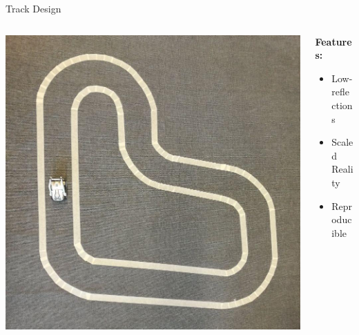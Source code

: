 \documentclass[aspectratio=169]{beamer}
\begin{document}
\begin{frame}{Track Design}
	\centering
	\begin{columns}
		\begin{column}{0.5\linewidth}
			\begin{center}
				\includegraphics[height=0.6\textheight]{img/track.png}
			\end{center}
		\end{column}
		\begin{column}{0.5\linewidth}
			\textbf<1->{Features:}
			\begin{itemize}%
				\item{Low-reflections}
				\item{Scaled Reality}
				\item{Reproducible}
			\end{itemize}
		\end{column}
	\end{columns}
\end{frame}
\end{document}
